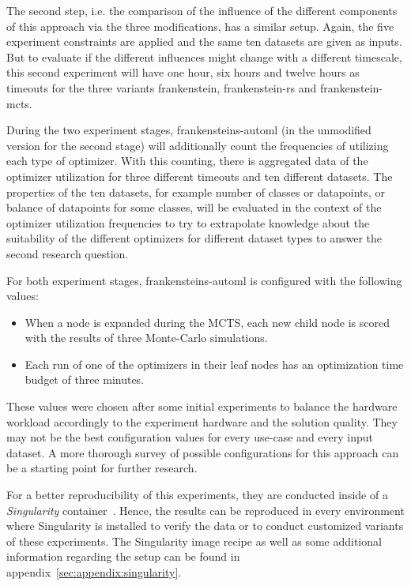 The second step, i.e. the comparison of the influence of the different components of this approach via the three modifications, has a similar setup.
Again, the five experiment constraints are applied and the same ten datasets are given as inputs.
But to evaluate if the different influences might change with a different timescale, this second experiment will have one hour, six hours and twelve hours as timeouts for the three variants frankenstein, frankenstein-rs and frankenstein-mcts.

During the two experiment stages, frankensteins-automl (in the unmodified version for the second stage) will additionally count the frequencies of utilizing each type of optimizer.
With this counting, there is aggregated data of the optimizer utilization for three different timeouts and ten different datasets.
The properties of the ten datasets, for example number of classes or datapoints, or balance of datapoints for some classes, will be evaluated in the context of the optimizer utilization frequencies to try to extrapolate knowledge about the suitability of the different optimizers for different dataset types to answer the second research question.

For both experiment stages, frankensteins-automl is configured with the following values:
\begin{itemize}
    \item When a node is expanded during the MCTS, each new child node is scored with the results of three Monte-Carlo simulations.
    \item Each run of one of the optimizers in their leaf nodes has an optimization time budget of three minutes.
\end{itemize}
These values were chosen after some initial experiments to balance the hardware workload accordingly to the experiment hardware and the solution quality.
They may not be the best configuration values for every use-case and every input dataset.
A more thorough survey of possible configurations for this approach can be a starting point for further research.

For a better reproducibility of this experiments, they are conducted inside of a \textit{Singularity} container~\cite{Kurtzer-Singularity}.
Hence, the results can be reproduced in every environment where Singularity is installed to verify the data or to conduct customized variants of these experiments.
The Singularity image recipe as well as some additional information regarding the setup can be found in appendix~\ref{sec:appendix:singularity}.

